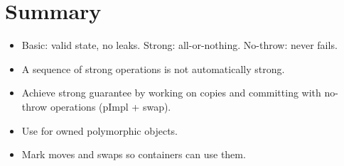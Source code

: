 \section*{Summary}
\begin{itemize}
  \item Basic: valid state, no leaks. Strong: all-or-nothing. No-throw: never
        fails.
  \item A sequence of strong operations is not automatically strong.
  \item Achieve strong guarantee by working on copies and committing with
        no-throw operations (pImpl + swap).
  \item Use  for owned polymorphic objects.
  \item Mark moves and swaps  so containers can use them.
\end{itemize}

